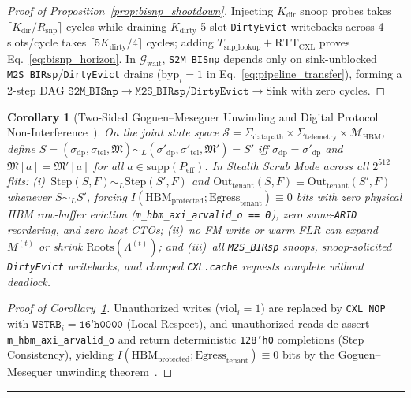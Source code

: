 \documentclass[10pt,twocolumn]{article}
\makeatletter
\newif\ifspecintwocol \specintwocolfalse
\newif\ifspecresume   \specresumefalse
\newcommand{\StartTwoCol}{%
  \if@twocolumn
    \let\spec@next\@empty
  \else
    \ifspecintwocol
      \let\spec@next\@empty
    \else
      \global\specintwocoltrue
      \def\spec@next{\begin{multicols}{2}}%
    \fi
  \fi
  \spec@next
}
\newcommand{\EndConnesPlate}{%
  \par\vspace{3pt}\noindent\textcolor{black!25}{\rule{\textwidth}{0.4pt}}\par\vspace{4pt}%
  \ifspecresume
    \global\specresumefalse
    \let\spec@platepost\StartTwoCol
  \else
    \let\spec@platepost\@empty
  \fi
  \spec@platepost
}
\theoremstyle{spectralthm}
\newtheorem{corollary}[theorem]{Corollary}
\makeatother
\begin{document}
\begin{proof}[Proof of Proposition~\ref{prop:bisnp_shootdown}]
Injecting $K_{\mathrm{dir}}$ snoop probes takes $\lceil K_{\mathrm{dir}}/R_{\mathrm{snp}} \rceil$ cycles while draining $K_{\mathrm{dirty}}$ 5-slot \texttt{DirtyEvict} writebacks across 4 slots/cycle takes $\lceil 5 K_{\mathrm{dirty}}/4 \rceil$ cycles; adding $T_{\mathrm{snp\_lookup}} + \mathrm{RTT}_{\mathrm{CXL}}$ proves Eq.~\eqref{eq:bisnp_horizon}. In $\mathcal{G}_{\mathrm{wait}}$, \texttt{S2M\_BISnp} depends only on sink-unblocked \texttt{M2S\_BIRsp}/\texttt{DirtyEvict} drains ($\mathrm{byp}_i = 1$ in Eq.~\eqref{eq:pipeline_transfer}), forming a 2-step DAG $\texttt{S2M\_BISnp} \rightarrow \texttt{M2S\_BIRsp/DirtyEvict} \rightarrow \text{Sink}$ with zero cycles.
\end{proof}

\begin{corollary}[Two-Sided Goguen--Meseguer Unwinding and Digital Protocol Non-Interference~\cite{goguen1982security}]
\label{cor:unwinding}
On the joint state space $\mathcal{S} = \Sigma_{\mathrm{datapath}} \times \Sigma_{\mathrm{telemetry}} \times \mathcal{M}_{\mathrm{HBM}}$, define $S = (\sigma_{\mathrm{dp}}, \sigma_{\mathrm{tel}}, \mathfrak{M}) \sim_L (\sigma'_{\mathrm{dp}}, \sigma'_{\mathrm{tel}}, \mathfrak{M}') = S'$ iff $\sigma_{\mathrm{dp}} = \sigma'_{\mathrm{dp}}$ and $\mathfrak{M}[a] = \mathfrak{M}'[a]$ for all $a \in \mathrm{supp}(P_{\mathrm{eff}})$. In Stealth Scrub Mode across all $2^{512}$ flits: (i)~$\mathrm{Step}(S, F) \sim_L \mathrm{Step}(S', F)$ and $\mathrm{Out}_{\mathrm{tenant}}(S, F) \equiv \mathrm{Out}_{\mathrm{tenant}}(S', F)$ whenever $S \sim_L S'$, forcing $I(\mathrm{HBM}_{\mathrm{protected}}; \mathrm{Egress}_{\mathrm{tenant}}) \equiv 0$ bits with zero physical HBM row-buffer eviction (\texttt{m\_hbm\_axi\_arvalid\_o == 0}), zero same-\texttt{ARID} reordering, and zero host CTOs; (ii)~no FM write or warm FLR can expand $M^{(t)}$ or shrink $\mathrm{Roots}(\Lambda^{(t)})$; and (iii)~all \texttt{M2S\_BIRsp} snoops, snoop-solicited \texttt{DirtyEvict} writebacks, and clamped \texttt{CXL.cache} requests complete without deadlock.
\end{corollary}
\begin{proof}[Proof of Corollary~\ref{cor:unwinding}]
Unauthorized writes ($\mathrm{viol}_i = 1$) are replaced by \texttt{CXL\_NOP} with $\texttt{WSTRB}_i = \texttt{16'h0000}$ (Local Respect), and unauthorized reads de-assert \texttt{m\_hbm\_axi\_arvalid\_o} and return deterministic \texttt{128'h0} completions (Step Consistency), yielding $I(\mathrm{HBM}_{\mathrm{protected}}; \mathrm{Egress}_{\mathrm{tenant}}) \equiv 0$ bits by the Goguen--Meseguer unwinding theorem~\cite{goguen1982security}.
\end{proof}
\global\specresumefalse\EndConnesPlate
\end{document}

